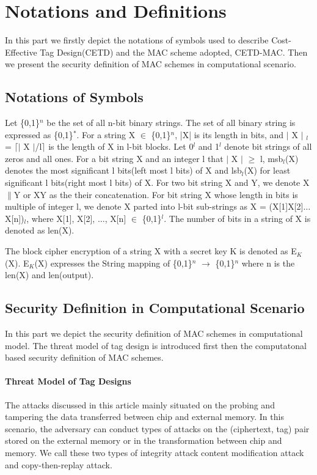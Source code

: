 \documentclass{article}
\begin{document}

\printnomenclature
\section{Notations and Definitions}
In this part we firstly depict the notations of symbols used to describe Cost-Effective Tag Design(CETD) and the MAC scheme adopted, CETD-MAC. Then we present the security definition of MAC schemes in computational scenario.
\subsection{Notations of Symbols}
Let \{0,1\}$^n$ be the set of all n-bit binary strings.  The set of all binary string is expressed as \{0,1\}$^*$.  
For a string X $\in$ \{0,1\}$^n$, |X| is its length in bits, and $\vert$ X $\vert$ $_l$ = $\lceil$$\vert$ X $\vert$/l$\rceil$ is the length of X in l-bit blocks.  Let 0$^l$ and 1$^l$ denote bit strings of all zeros and all ones. 
For a bit string X and an integer l that $\vert$ X $\vert$ $\geq$ l, msb$_l$(X) denotes the most significant l bits(left most l bits) of X and lsb$_l$(X) for least significant l bits(right most l bits) of X.
For two bit string X and Y, we denote X$\|$Y  or XY as the their concatenation. For bit string X whose length in bits is multiple of integer l, we denote X parted into l-bit sub-strings as X = (X[1]X[2]$\ldots$X[n])$_l$, where X[1], X[2], $\ldots$, X[n] $\in$ \{0,1\}$^l$.
The number of bits in a string of X is denoted as len(X).

The block cipher encryption of a string X with a secret key K is denoted as E$_K$(X). E$_K$(X) expresses the String mapping of \{0,1\}$^n$ $\rightarrow$ \{0,1\}$^n$ where n is the len(X) and len(output).

\subsection{Security Definition in Computational Scenario}
In this part we depict the security definition of MAC schemes in computational model.  The threat model of tag design is introduced first then the computatonal based security definition of MAC schemes. 
\paragraph{Threat Model of Tag Designs}
The attacks discussed in this article mainly situated on the probing and
tampering the data transferred between chip and external memory. In this scenario, the adversary can conduct types of attacks on the (ciphertext, tag) pair stored on the external memory or in the transformation between chip and memory. We call these two types of integrity attack content modification attack and copy-then-replay attack. 
\end{document}
